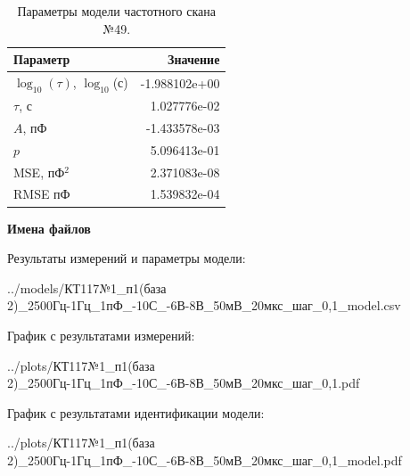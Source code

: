 \begin{table}[!ht]
    \centering
    \caption{Параметры модели частотного скана №49.}
    \begin{tabular}{|l|r|}
        \hline
        Параметр                                       & Значение                  \\ \hline
        $\log_{10}(\tau)$, $\log_{10}$(с)              & -1.988102e+00             \\ \hline
        $\tau$, с                                      & 1.027776e-02              \\ \hline
        $A$, пФ                                        & -1.433578e-03             \\ \hline
        $p$                                            & 5.096413e-01              \\ \hline
        MSE, пФ$^2$                                    & 2.371083e-08              \\ \hline
        RMSE пФ                                        & 1.539832e-04              \\ \hline
    \end{tabular}
    \label{table:frequency_scan_model_49}
\end{table}

\textbf{Имена файлов}

Результаты измерений и параметры модели:

\scriptsize../models/КТ117№1\_п1(база 2)\_2500Гц-1Гц\_1пФ\_-10С\_-6В-8В\_50мВ\_20мкс\_шаг\_0,1\_model.csv
\normalsize

График с результатами измерений:

\scriptsize../plots/КТ117№1\_п1(база 2)\_2500Гц-1Гц\_1пФ\_-10С\_-6В-8В\_50мВ\_20мкс\_шаг\_0,1.pdf
\normalsize

График с результатами идентификации модели:

\scriptsize../plots/КТ117№1\_п1(база 2)\_2500Гц-1Гц\_1пФ\_-10С\_-6В-8В\_50мВ\_20мкс\_шаг\_0,1\_model.pdf
\normalsize

